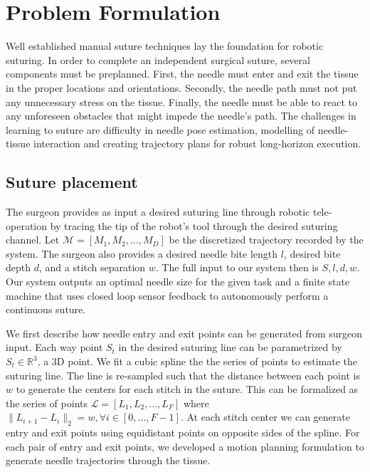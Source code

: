 \documentclass[0-suturing.tex]{subfiles}
\begin{document}
\section{Problem Formulation}
\label{sec:problem}
Well established manual suture techniques lay the foundation for robotic suturing. In order to complete an independent surgical suture, several components must be preplanned. First, the needle
must enter and exit the tissue in the proper locations and
orientations. Secondly, the needle path must not put any
unnecessary stress on the tissue. Finally, the needle must be
able to react to any unforeseen obstacles that might impede
the needle’s path.
The challenges in learning to suture are difficulty in needle pose estimation, modelling of needle-tissue interaction and creating trajectory plans for robust long-horizon execution. 

\subsection{Suture placement}
The surgeon provides as input a desired suturing line through robotic tele-operation by tracing the tip of the robot's tool through the desired
suturing channel. Let $\mathcal{M} = [M_1, M_2, \ldots, M_D]$ be the discretized trajectory recorded by the system. The surgeon also provides a desired needle bite length $l$, desired bite depth $d$, and a stitch separation $w$.
The full input to our system then is $S,l,d,w$.
Our system outputs an optimal needle size for the given task and  a finite state machine that uses closed loop sensor feedback to autonomously perform a continuous suture. 

We first describe how needle entry and exit points can be generated from surgeon input. Each way point $S_t$ in the desired suturing line can be parametrized by $S_t \in \mathbb{R}^3$, a 3D point. We fit a cubic spline the the series of points to estimate the suturing line. The line is re-sampled such that the distance between each point is $w$ to generate the centers for each stitch in the suture. This can be formalized as the series of points $\mathcal{L} = [L_1, L_2, \ldots, L_F] $ where $ \|L_{i+1} - L_{i}\|_2 = w, \forall i \in [0, \dots, F-1]$. At each stitch center we can generate entry and exit points using equidistant points on opposite sides of the spline.
For each pair of entry and exit points, we developed a motion planning formulation to generate needle trajectories through the tissue.
\end{document}
